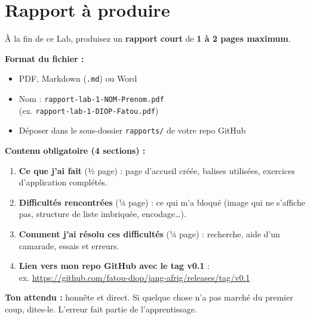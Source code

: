 \documentclass[11pt,a4paper]{article}
\begin{document}
\section{Rapport à produire}

\begin{attentionbox}
À la fin de ce Lab, produisez un \textbf{rapport court} de
\textbf{1 à 2 pages maximum}.

\medskip

\textbf{Format du fichier :}
\begin{itemize}[nosep]
    \item PDF, Markdown (\texttt{.md}) ou Word
    \item Nom : \texttt{rapport-lab-1-NOM-Prenom.pdf}\\
          (ex. \texttt{rapport-lab-1-DIOP-Fatou.pdf})
    \item Déposer dans le sous-dossier \texttt{rapports/} de votre repo GitHub
\end{itemize}

\medskip

\textbf{Contenu obligatoire (4 sections) :}

\begin{enumerate}[nosep]
    \item \textbf{Ce que j'ai fait} (½ page) : page d'accueil créée, balises utilisées, exercices d'application complétés.
    \item \textbf{Difficultés rencontrées} (¼ page) : ce qui m'a bloqué (image qui ne s'affiche pas, structure de liste imbriquée, encodage\ldots).
    \item \textbf{Comment j'ai résolu ces difficultés} (¼ page) : recherche, aide d'un camarade, essais et erreurs.
    \item \textbf{Lien vers mon repo GitHub avec le tag v0.1} : \\
          ex. \url{https://github.com/fatou-diop/jang-afrig/releases/tag/v0.1}
\end{enumerate}

\medskip

\textbf{Ton attendu :} honnête et direct. Si quelque chose n'a pas marché
du premier coup, dites-le. L'erreur fait partie de l'apprentissage.
\end{attentionbox}

\end{document}
